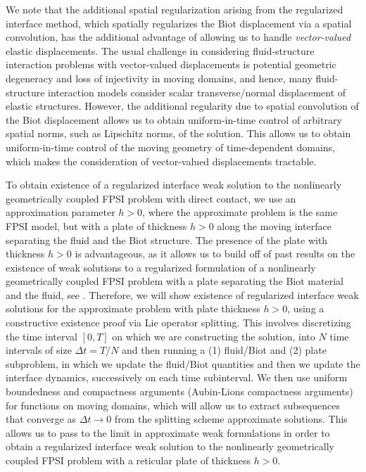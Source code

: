 \documentclass[11pt]{article}
\theoremstyle{definition}
\begin{document}
We note that the additional spatial regularization arising from the regularized interface method, which spatially regularizes the Biot displacement via a spatial convolution, has the additional advantage of allowing us to handle \textit{vector-valued} elastic displacements. The usual challenge in considering fluid-structure interaction problems with vector-valued displacements is potential geometric degeneracy and loss of injectivity in moving domains, and hence, many fluid-structure interaction models consider scalar transverse/normal displacement of elastic structures. However, the additional regularity due to spatial convolution of the Biot displacement allows us to obtain uniform-in-time control of arbitrary spatial norms, such as Lipschitz norms, of the solution. This allows us to obtain uniform-in-time control of the moving geometry of time-dependent domains, which makes the consideration of vector-valued displacements tractable. 

To obtain existence of a regularized interface weak solution to the nonlinearly geometrically coupled FPSI problem with direct contact, we use an approximation parameter $h > 0$, where the approximate problem is the same FPSI model, but with a plate of thickness $h > 0$ along the moving interface separating the fluid and the Biot structure. The presence of the plate with thickness $h > 0$ is advantageous, as it allows us to build off of past results on the existence of weak solutions to a regularized formulation of a nonlinearly geometrically coupled FPSI problem with a plate separating the Biot material and the fluid, see \cite{FPSIJMPA}. Therefore, we will show existence of regularized interface weak solutions for the approximate problem with plate thickness $h > 0$, using a constructive existence proof via Lie operator splitting. This involves discretizing the time interval $[0, T]$ on which we are constructing the solution, into $N$ time intervals of size $\Delta t = T/N$ and then running a (1) fluid/Biot and (2) plate subproblem, in which we update the fluid/Biot quantities and then we update the interface dynamics, successively on each time subinterval. We then use uniform boundedness and compactness arguments (Aubin-Lions compactness arguments) for functions on moving domains, which will allow us to extract subsequences that converge as $\Delta t \to 0$ from the splitting scheme approximate solutions. This allows us to pass to the limit in approximate weak formulations in order to obtain a regularized interface weak solution to the nonlinearly geometrically coupled FPSI problem with a reticular plate of thickness $h > 0$. 
\end{document}
